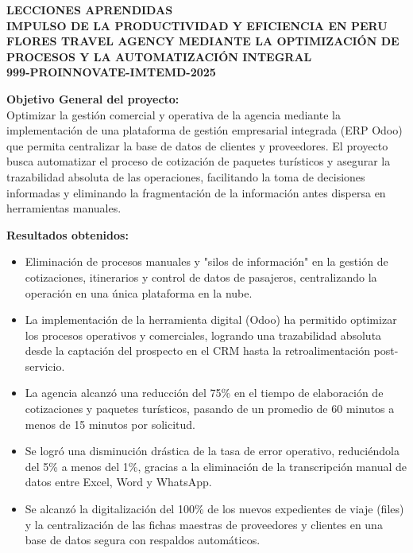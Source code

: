 \documentclass[11pt]{article}
\begin{document}
\begin{center}
    {\Large \textbf{LECCIONES APRENDIDAS}}\\[0.25cm]
    {\Large \textbf{IMPULSO DE LA PRODUCTIVIDAD Y EFICIENCIA EN PERU FLORES TRAVEL AGENCY MEDIANTE LA OPTIMIZACIÓN DE PROCESOS Y LA AUTOMATIZACIÓN INTEGRAL}}\\[0.25cm]
    {\large \textbf{999-PROINNOVATE-IMTEMD-2025}}
\end{center}

\textbf{Objetivo General del proyecto:}\\
Optimizar la gestión comercial y operativa de la agencia mediante la implementación de una plataforma de gestión empresarial integrada (ERP Odoo) que permita centralizar la base de datos de clientes y proveedores. El proyecto busca automatizar el proceso de cotización de paquetes turísticos y asegurar la trazabilidad absoluta de las operaciones, facilitando la toma de decisiones informadas y eliminando la fragmentación de la información antes dispersa en herramientas manuales.

\textbf{Resultados obtenidos:}
\begin{itemize}
    \item Eliminación de procesos manuales y "silos de información" en la gestión de cotizaciones, itinerarios y control de datos de pasajeros, centralizando la operación en una única plataforma en la nube.
    \item La implementación de la herramienta digital (Odoo) ha permitido optimizar los procesos operativos y comerciales, logrando una trazabilidad absoluta desde la captación del prospecto en el CRM hasta la retroalimentación post-servicio.
    \item La agencia alcanzó una reducción del 75\% en el tiempo de elaboración de cotizaciones y paquetes turísticos, pasando de un promedio de 60 minutos a menos de 15 minutos por solicitud.
    \item Se logró una disminución drástica de la tasa de error operativo, reduciéndola del 5\% a menos del 1\%, gracias a la eliminación de la transcripción manual de datos entre Excel, Word y WhatsApp.
    \item Se alcanzó la digitalización del 100\% de los nuevos expedientes de viaje (files) y la centralización de las fichas maestras de proveedores y clientes en una base de datos segura con respaldos automáticos.
\end{itemize}
\end{document}
